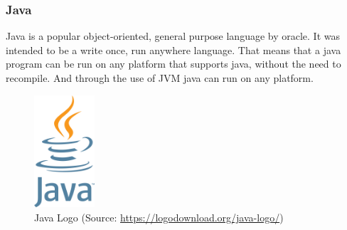 \Author{\daAuthorTwo}

\subsubsection{Java}
Java is a popular object-oriented, general purpose language by oracle. It was intended to be a write once, run anywhere language. That means that a java program can be run on any platform that supports java, without the need to recompile. And through the use of JVM java can run on any platform. 

\begin{figure} [H]
    \center
    \includegraphics [width=0.2\textwidth] {images/Technologies/javaLogo.png}
    \caption{Java Logo (Source: \url{https://logodownload.org/java-logo/})}
\end{figure}